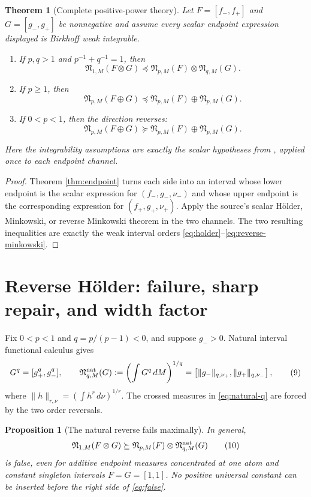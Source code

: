 \documentclass[10pt]{article}
\newtheorem{theorem}{Theorem}
\newtheorem{proposition}{Proposition}
\newcommand{\N}{\mathfrak N}
\begin{document}
\begin{theorem}[Complete positive-power theory]\label{thm:positive}
Let $F=[f_-,f_+]$ and $G=[g_-,g_+]$ be nonnegative and assume every scalar
endpoint expression displayed is Birkhoff weak integrable.
\begin{enumerate}
\item If $p,q>1$ and $p^{-1}+q^{-1}=1$, then
\[
 \N_{1,M}(F\otimes G)
 \preceq \N_{p,M}(F)\otimes\N_{q,M}(G).
\tag{6}\label{eq:holder}
\]
\item If $p\ge1$, then
\[
 \N_{p,M}(F\oplus G)
 \preceq \N_{p,M}(F)\oplus\N_{p,M}(G).
\tag{7}\label{eq:minkowski}
\]
\item If $0<p<1$, then the direction reverses:
\[
 \N_{p,M}(F\oplus G)
 \succeq \N_{p,M}(F)\oplus\N_{p,M}(G).
\tag{8}\label{eq:reverse-minkowski}
\]
\end{enumerate}
Here the integrability assumptions are exactly the scalar hypotheses from
\cite{CISZ}, applied once to each endpoint channel.
\end{theorem}

\begin{proof}
Theorem \ref{thm:endpoint} turns each side into an interval whose lower
endpoint is the scalar expression for $(f_-,g_-,\nu_-)$ and whose upper
endpoint is the corresponding expression for $(f_+,g_+,\nu_+)$.  Apply the
source's scalar Hölder, Minkowski, or reverse Minkowski theorem in the two
channels.  The two resulting inequalities are exactly the weak interval
orders \eqref{eq:holder}--\eqref{eq:reverse-minkowski}.
\end{proof}

\section{Reverse Hölder: failure, sharp repair, and width factor}

Fix $0<p<1$ and $q=p/(p-1)<0$, and suppose $g_->0$.  Natural interval
functional calculus gives
\[
 G^q=[g_+^q,g_-^q],\qquad
 \N^{\rm nat}_{q,M}(G):=\left(\int G^q\,dM\right)^{1/q}
 =\left[\|g_-\|_{q,\nu_+},\|g_+\|_{q,\nu_-}\right],
\tag{9}\label{eq:natural-q}
\]
where $\|h\|_{r,\nu}=(\int h^r\,d\nu)^{1/r}$.  The crossed measures in
\eqref{eq:natural-q} are forced by the two order reversals.

\begin{proposition}[The natural reverse fails maximally]\label{prop:failure}
In general,
\[
 \N_{1,M}(F\otimes G)\succeq
 \N_{p,M}(F)\otimes\N^{\rm nat}_{q,M}(G)
\tag{10}\label{eq:false}
\]
is false, even for additive endpoint measures concentrated at one atom and
constant singleton intervals $F=G=[1,1]$.  No positive universal constant can
be inserted before the right side of \eqref{eq:false}.
\end{proposition}
\end{document}
